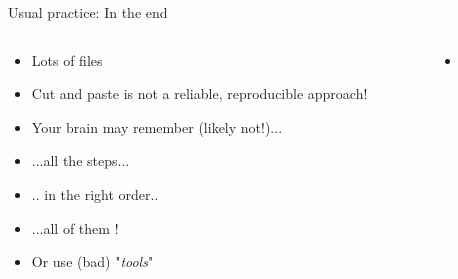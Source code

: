 \documentclass[xcolor=x11names,compress]{beamer}
\renewcommand{\(}{\begin{columns}}
\renewcommand{\)}{\end{columns}}
\newcommand{\<}[1]{\begin{column}{#1}}
\renewcommand{\>}{\end{column}}
\begin{document}
\begin{frame}{Usual practice: In the end}

 \begin{columns}[T]
    \begin{column}{0.5\textwidth}
      \begin{itemize}[<+->]
        \item Lots of files
        \item Cut and paste is not a reliable, reproducible approach!
        \item Your brain may remember (likely not!)...
        \item[] ...all the steps...
        \item[] .. in the right order..
        \item[]...all of them !
        \item Or use (bad) "\emph{tools}"
      \end{itemize}
    \end{column}
    \begin{column}{0.5\textwidth}
       \begin{itemize}
       \item[] 

\end{itemize}
\end{column}
\end{columns}
\end{frame}
\end{document}
